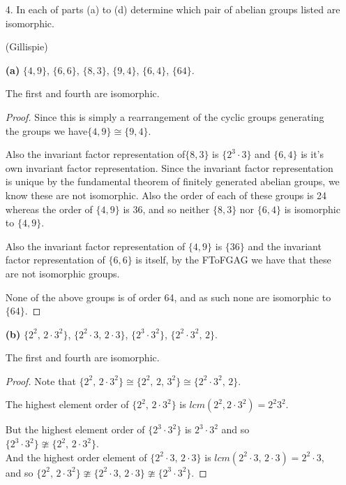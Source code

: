 \documentclass[10pt]{article}
\begin{document}
\begin{itemize}
\begin{proof}
\end{proof}


\item[4.]  In each of parts (a) to (d) determine which pair of abelian
groups listed are isomorphic.

(Gillispie)  

\textbf{(a)} $\{4,9\}$, $\{6,6\}$, $\{8,3\}$, $\{9,4\}$, $\{6,4\}$,
$\{64\}$.   

The first and fourth are isomorphic.

\begin{proof}  Since this is simply a rearrangement of the cyclic
groups generating the groups we have$\{4,9\}\cong\{9,4\}$.

Also the invariant factor representation of$\{8,3\}$ is $\{2^{3}\cdot3\}$
and $\{6,4\}$ is it's own invariant factor representation. Since
the invariant factor representation is unique by the fundamental theorem
of finitely generated abelian groups, we know these are not isomorphic.
Also the order of each of these groups is 24 whereas the order of
$\{4,9\}$ is 36, and so neither $\{8,3\}$ nor $\{6,4\}$ is isomorphic
to $\{4,9\}$.

Also the invariant factor representation of $\{4,9\}$ is $\{36\}$
and the invariant factor representation of $\{6,6\}$ is itself, by
the FToFGAG we have that these are not isomorphic groups.

None of the above groups is of order 64, and as such none are isomorphic
to $\{64\}$.
\end{proof}

\textbf{(b)} $\{2^{2},\,2\cdot3^{2}\}$, $\{2^{2}\cdot3,\,2\cdot3\}$,
$\{2^{3}\cdot3^{2}\}$, $\{2^{2}\cdot3^{2},\,2\}$.  

The first and fourth are isomorphic.

\begin{proof}  Note that $\{2^{2},\,2\cdot3^{2}\}\cong\{2^{2},\,2,\,3^{2}\}\cong\{2^{2}\cdot3^{2},\,2\}$. 

The highest element order of $\{2^{2},\,2\cdot3^{2}\}$ is $lcm(2^{2},2\cdot3^{2})=2^{2}3^{2}$.

But the highest element order of $\{2^{3}\cdot3^{2}\}$ is $2^{3}\cdot3^{2}$
and so $\{2^{3}\cdot3^{2}\}\ncong\{2^{2},\,2\cdot3^{2}\}$.\\
And the highest order element of $\{2^{2}\cdot3,\,2\cdot3\}$ is $lcm(2^{2}\cdot3,\,2\cdot3)=2^{2}\cdot3$,
and so $\{2^{2},\,2\cdot3^{2}\}\ncong\{2^{2}\cdot3,\,2\cdot3\}\ncong\{2^{3}\cdot3^{2}\}$.
\end{proof}


\end{itemize}
\end{document}

